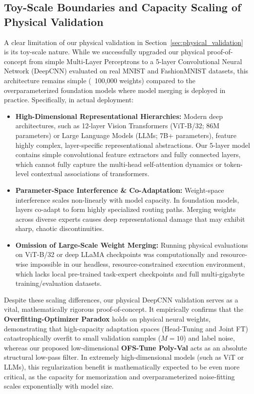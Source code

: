 \documentclass{article}
\theoremstyle{plain}
\theoremstyle{definition}
\theoremstyle{remark}
\begin{document}
\subsection{Toy-Scale Boundaries and Capacity Scaling of Physical Validation}
A clear limitation of our physical validation in Section~\ref{sec:physical_validation} is its toy-scale nature. While we successfully upgraded our physical proof-of-concept from simple Multi-Layer Perceptrons to a 5-layer Convolutional Neural Network (DeepCNN) evaluated on real MNIST and FashionMNIST datasets, this architecture remains simple (~100,000 weights) compared to the overparameterized foundation models where model merging is deployed in practice. 
Specifically, in actual deployment:
\begin{itemize}[noitemsep,topsep=0pt]
    \item \textbf{High-Dimensional Representational Hierarchies:} Modern deep architectures, such as 12-layer Vision Transformers (ViT-B/32; 86M parameters) or Large Language Models (LLMs; 7B+ parameters), feature highly complex, layer-specific representational abstractions. Our 5-layer model contains simple convolutional feature extractors and fully connected layers, which cannot fully capture the multi-head self-attention dynamics or token-level contextual associations of transformers.
    \item \textbf{Parameter-Space Interference \& Co-Adaptation:} Weight-space interference scales non-linearly with model capacity. In foundation models, layers co-adapt to form highly specialized routing paths. Merging weights across diverse experts causes deep representational damage that may exhibit sharp, chaotic discontinuities.
    \item \textbf{Omission of Large-Scale Weight Merging:} Running physical evaluations on ViT-B/32 or deep LLaMA checkpoints was computationally and resource-wise impossible in our headless, resource-constrained execution environment, which lacks local pre-trained task-expert checkpoints and full multi-gigabyte training/evaluation datasets. 
\end{itemize}
Despite these scaling differences, our physical DeepCNN validation serves as a vital, mathematically rigorous proof-of-concept. It empirically confirms that the \textbf{Overfitting-Optimizer Paradox} holds on physical neural weights, demonstrating that high-capacity adaptation spaces (Head-Tuning and Joint FT) catastrophically overfit to small validation samples ($M=10$) and label noise, whereas our proposed low-dimensional \textbf{OFS-Tune Poly-Val} acts as an absolute structural low-pass filter. In extremely high-dimensional models (such as ViT or LLMs), this regularization benefit is mathematically expected to be even more critical, as the capacity for memorization and overparameterized noise-fitting scales exponentially with model size.
\end{document}

